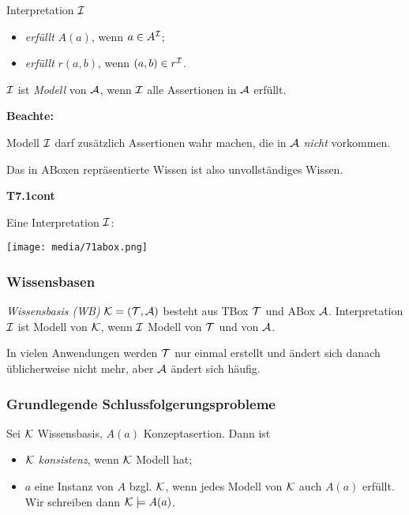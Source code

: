 \begin{definition}

Interpretation $\mathcal{I}$

\begin{itemize}
	\item \emph{erfüllt} $A(a)$, wenn $a \in A^{\mathcal{I}}$;
	\item \emph{erfüllt} $r(a,b)$, wenn $(a,b) \in r^{\mathcal{I}}$.
\end{itemize}

$\mathcal{I}$ ist \emph{Modell} von $\mathcal{A}$, wenn $\mathcal{I}$ alle Assertionen in $\mathcal{A}$ erfüllt.
\end{definition}

\textbf{Beachte:}

Modell $\mathcal{I}$ darf zusätzlich Assertionen wahr machen, die in $\mathcal{A}$ \emph{nicht} vorkommen.

Das in ABoxen repräsentierte Wissen ist also unvollständiges Wissen.

\textbf{T7.1cont}

Eine Interpretation $\mathcal{I}$:

\texttt{[image: media/71abox.png]}

\subsubsection{Wissensbasen}

\begin{definition}

\emph{Wissensbasis (WB)} $\mathcal{K} = (\mathcal{T} , \mathcal{A})$ besteht aus TBox $\mathcal{T}$ und ABox $\mathcal{A}$. Interpretation $\mathcal{I}$ ist Modell von $\mathcal{K}$, wenn $\mathcal{I}$ Modell von $\mathcal{T}$ und von $\mathcal{A}$.
\end{definition}

In vielen Anwendungen werden $\mathcal{T}$ nur einmal erstellt und ändert sich danach üblicherweise nicht mehr, aber $\mathcal{A}$ ändert sich häufig.

\subsubsection{Grundlegende Schlussfolgerungsprobleme}

\begin{definition}

Sei $\mathcal{K}$ Wissensbasis, $A(a)$ Konzeptasertion. Dann ist

\begin{itemize}
	\item $\mathcal{K}$ \emph{konsistenz}, wenn $\mathcal{K}$ Modell hat;
	\item $a$ eine Instanz von $A$ bzgl. $\mathcal{K}$, wenn jedes Modell von $\mathcal{K}$ auch $A(a)$ erfüllt. Wir schreiben dann $\mathcal{K} \models A(a)$.
\end{itemize}
\end{definition}

